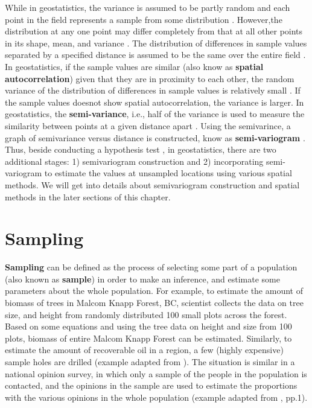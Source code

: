 \documentclass[
]{book}
\begin{document}
While in geostatistics, the variance is assumed to be partly random and each point in the field represents a sample from some distribution \citep{Jacquez1999}. However,the distribution at any one point may differ completely from that at all other points in its shape, mean, and variance \citep{Jacquez1999}. The distribution of differences in sample values separated by a specified distance is assumed to be the same over the entire field \citep{Jacquez1999}. In geostatistics, if the sample values are similar (also know as \textbf{spatial autocorrelation}) given that they are in proximity to each other, the random variance of the distribution of differences in sample values is relatively small \citep{Jacquez1999}. If the sample values doesnot show spatial autocorrelation, the variance is larger. In geostatistics, the \textbf{semi-variance}, i.e., half of the variance is used to measure the similarity between points at a given distance apart \citep{Jacquez1999}. Using the semivarince, a graph of semivariance versus distance is constructed, know as \textbf{semi-variogram} \citep{Jacquez1999}. Thus, beside conducting a hypothesis test , in geostatistics, there are two additional stages: 1) semivariogram construction and 2) incorporating semi-variogram to estimate the values at unsampled locations using various spatial methods. We will get into details about semivariogram construction and spatial methods in the later sections of this chapter.

\hypertarget{sampling-1}{%
\section{Sampling}\label{sampling-1}}

\textbf{Sampling} can be defined as the process of selecting some part of a population (also known as \textbf{sample}) in order to make an inference, and estimate some parameters about the whole population\citep{thompson2012sampling}. For example, to estimate the amount of biomass of trees in Malcom Knapp Forest, BC, scientist collects the data on tree size, and height from randomly distributed 100 small plots across the forest. Based on some equations and using the tree data on height and size from 100 plots, biomass of entire Malcom Knapp Forest can be estimated. Similarly, to estimate the amount of recoverable oil in a region, a few (highly expensive) sample holes are drilled (example adapted from \citet{thompson2012sampling}). The situation is similar in a national opinion survey, in which only a sample of the people in the population is contacted, and the opinions in the sample are used to estimate the proportions with the various opinions in the whole population (example adapted from \citet{thompson2012sampling}, pp.1).
\end{document}
